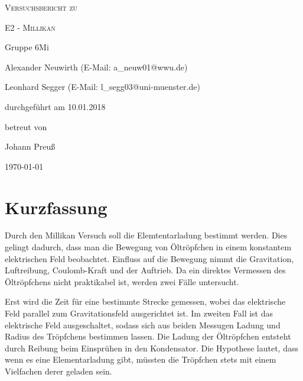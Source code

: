 \documentclass[
	a4paper,
	12pt,
	pagesize,
	ngerman
]{scrartcl}
\begin{document}
	
	\begin{titlepage}
		\centering
		{\scshape\LARGE Versuchsbericht zu \par}
		\vspace{1cm}
		{\scshape\huge E2 - Millikan \par}
		\vspace{2.5cm}
		{\LARGE Gruppe 6Mi \par}
		\vspace{0.5cm}
		
		{\large Alexander Neuwirth (E-Mail: a\_neuw01@wwu.de) \par}
		{\large Leonhard Segger (E-Mail: l\_segg03@uni-muenster.de) \par}
		\vfill
		
		durchgeführt am 10.01.2018\par
		betreut von\par
		{\large Johann Preuß}
		
		\vfill
		
		{\large \today\par}
	\end{titlepage}
	\tableofcontents
	\newpage
	
	\section{Kurzfassung}
	Durch den Millikan Versuch soll die Elemtentarladung bestimmt werden.
	Dies gelingt dadurch, dass man die Bewegung von Öltröpfchen in einem konstantem elektrischen Feld beobachtet.
	Einfluss auf die Bewegung nimmt die Gravitation, Luftreibung, Coulomb-Kraft und der Auftrieb.
	Da ein direktes Vermessen des Öltröpfchens nicht praktikabel ist, werden zwei Fälle untersucht.

	Erst wird die Zeit für eine bestimmte Strecke gemessen, wobei das elektrische Feld parallel zum Gravitationsfeld ausgerichtet ist. 
	Im zweiten Fall ist das elektrische Feld ausgeschaltet, sodass sich aus beiden Messugen Ladung und Radius des Tröpfchens bestimmen lassen.
	Die Ladung der Öltröpfchen entsteht durch Reibung beim Einsprühen in den Kondensator. 
	Die Hypothese lautet, dass wenn es eine Elementarladung gibt, müssten die Tröpfchen stets mit einem Vielfachen derer geladen sein. 
\end{document}
